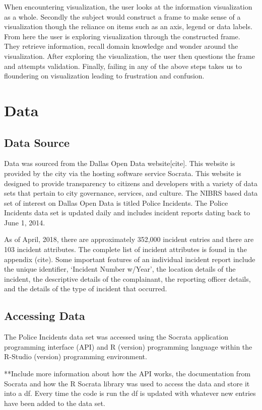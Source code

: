 \documentclass[runningheads]{llncs}
\begin{document}
When encountering visualization, the user looks at the information visualization as a whole. Secondly the subject would construct a frame to make sense of a visualization though the reliance on items such as an axis, legend or data labels. From here the user is exploring visualization through the constructed frame. They retrieve information, recall domain knowledge and wonder around the visualization. After exploring the visualization, the user then questions the frame and attempts validation. Finally, failing in any of the above steps takes us to floundering on visualization leading to frustration and confusion.

\section{Data}
\subsection{Data Source}
Data was sourced from the Dallas Open Data website[cite]. This website is provided by the city via the hosting software service Socrata. This website is designed to provide transparency to citizens and developers with a variety of data sets that pertain to city governance, services, and culture. The NIBRS based data set of interest on Dallas Open Data is titled Police Incidents. The Police Incidents data set is updated daily and includes incident reports dating back to June 1, 2014.

As of April, 2018, there are approximately 352,000 incident entries and there are 103 incident attributes. The complete list of incident attributes is found in the appendix (cite). Some important features of an individual incident report include the unique identifier, ‘Incident Number w/Year’, the location details of the incident, the descriptive details of the complainant, the reporting officer details, and the details of the type of incident that occurred.

\subsection{Accessing Data}
The Police Incidents data set was accessed using the Socrata application programming interface (API) and R (version) programming language within the R-Studio (version) programming environment. 

**Include more information about how the API works, the documentation from Socrata and how the R Socrata library was used to access the data and store it into a df. Every time the code is run the df is updated with whatever new entries have been added to the data set.
\end{document}

